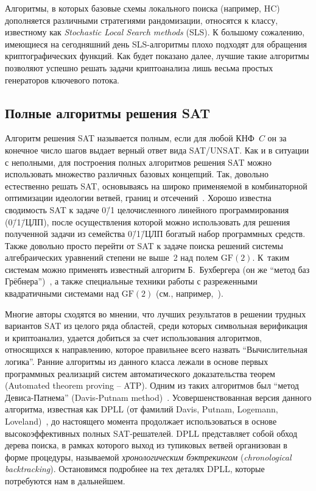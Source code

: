 Алгоритмы, в которых базовые схемы локального поиска (например, HC) дополняется различными стратегиями рандомизации, относятся к классу, известному как \textit{Stochastic Local Search methods} (SLS).
К большому сожалению, имеющиеся на сегодняшний день SLS-алгоритмы плохо подходят для обращения криптографических функций.
Как будет показано далее, лучшие такие алгоритмы позволяют успешно решать задачи криптоанализа лишь весьма простых генераторов ключевого потока.

\subsection{Полные алгоритмы решения SAT}

Алгоритм решения SAT называется полным, если для любой КНФ~$C$ он за конечное число шагов выдает верный ответ вида SAT/UNSAT.
Как и в ситуации с неполными, для построения полных алгоритмов решения SAT можно использовать множество различных базовых концепций.
Так, довольно естественно решать SAT, основываясь на широко применяемой в комбинаторной оптимизации идеологии ветвей, границ и отсечений~\cite{papadimitriou1982}.
Хорошо известна сводимость SAT к задаче 0\=/1 целочисленного линейного программирования (0\=/1\=/ЦЛП), после осуществления которой можно использовать для решения полученной задачи из семейства 0\=/1\=/ЦЛП богатый набор программных средств.
Также довольно просто перейти от SAT к задаче поиска решений системы алгебраических уравнений степени не выше~2 над полем $\mathrm{GF}(2)$.
К~таким системам можно применять известный алгоритм Б.~Бухбергера (он же \enquote{метод баз Грёбнера})~\cite{buchberger2006}, а также специальные техники работы с разреженными квадратичными системами над $\mathrm{GF}(2)$ (см., например,~\cite{goos1999,courtois2002}).

Многие авторы сходятся во мнении, что лучших результатов в решении трудных вариантов SAT из целого ряда областей, среди которых символьная верификация и криптоанализ, удается добиться за счет использования алгоритмов, относящихся к направлению, которое правильнее всего назвать \enquote{Вычислительная логика}.
Ранние алгоритмы из данного класса лежали в основе первых программных реализаций систем автоматического доказательства теорем (Automated theorem proving \--- ATP).
Одним из таких алгоритмов был \enquote{метод Девиса-Патнема} (Davis-Putnam method)~\cite{davis1960}.
Усовершенствованная версия данного алгоритма, известная как DPLL (от фамилий Davis, Putnam, Logemann, Loveland)~\cite{davis1967}, до настоящего момента продолжает использоваться в основе высокоэффективных полных SAT-решателей.
DPLL представляет собой обход дерева поиска, в рамках которого выход из тупиковых ветвей организован в форме процедуры, называемой \textit{хронологическим бэктрекингом} (\textit{chronological backtracking}).
Остановимся подробнее на тех деталях DPLL, которые потребуются нам в дальнейшем.


